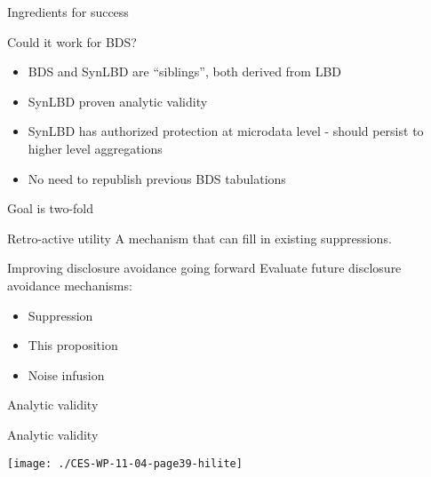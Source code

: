 \begin{frame}{Ingredients for success}
\begin{block}{Could it work for BDS?}
\begin{itemize}
\item BDS and SynLBD are ``siblings'', both derived from LBD
\item SynLBD proven analytic validity
\item SynLBD has authorized protection at microdata level - should persist to higher level aggregations
\item No need to republish previous BDS tabulations
\end{itemize}
\end{block}
\end{frame}


\begin{frame}{Goal is two-fold}
\begin{block}{Retro-active utility}
A mechanism that can fill in existing suppressions.
\end{block}
\begin{block}{Improving disclosure avoidance going forward}
Evaluate future disclosure avoidance mechanisms:
\begin{itemize}
	\item Suppression
	\item This proposition
	\item Noise infusion
\end{itemize}
\end{block}
\end{frame}

\begin{frame}{Analytic validity}
\begin{center}
\end{center}
\end{frame}

\begin{frame}{Analytic validity}
\begin{center}
\texttt{[image: ./CES-WP-11-04-page39-hilite]}
\end{center}
\end{frame}




